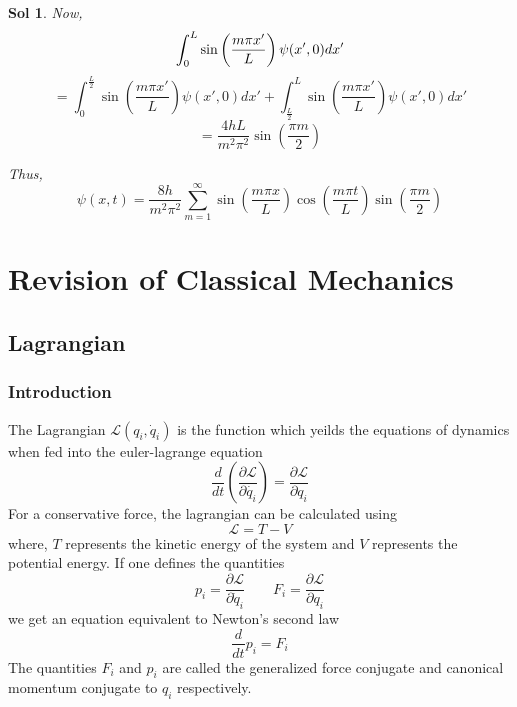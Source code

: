 \documentclass[12pt,a4paper]{report}
\newcommand{\der}[2]{\frac{d#1}{d#2}}
\newcommand{\parder}[2]{\frac{\partial#1}{\partial#2}}
\newcommand{\lagrangian}{\mathcal{L}}
\newcommand{\eulerlagrange}[1]{\der{}{t}\left( \parder{\lagrangian}{\dot{#1}} \right) = \parder{\lagrangian}{#1}}
\newtheorem*{solution}{Sol}
\begin{document}
\begin{solution}
    Now,
    \begin{equation*}
        \int_{0}^{L} \sin\left( \frac{m\pi x'}{L} \right)\psi(x', 0)dx' \\
    \end{equation*}
    \begin{equation*}
        = \int_{0}^{\frac{L}{2}} \sin\left( \frac{m\pi x'}{L} \right)\psi(x', 0)dx' + \int_{\frac{L}{2}}^{L} \sin\left( \frac{m\pi x'}{L} \right)\psi(x', 0)dx'
    \end{equation*}
    \begin{equation*}
        = \frac{4hL}{m^2\pi^2}\sin\left( \frac{\pi m}{2} \right)
    \end{equation*}

    Thus,
    \begin{equation*}
        \psi(x, t) = \frac{8h}{m^2\pi^2}\sum_{m=1}^{\infty}\sin\left( \frac{m\pi x}{L} \right)\cos\left( \frac{m\pi t}{L} \right)\sin\left( \frac{\pi m}{2} \right)
    \end{equation*}
\end{solution}


\chapter{Revision of Classical Mechanics}

\section{Lagrangian}

\subsection{Introduction}

The Lagrangian $\lagrangian(q_i, \dot{q}_i)$ is the function which yeilds the equations of dynamics when fed into the euler-lagrange equation
\begin{equation*}
    \eulerlagrange{q_i}
\end{equation*}
For a conservative force, the lagrangian can be calculated using
\begin{equation*}
    \lagrangian = T - V
\end{equation*}
where, $T$ represents the kinetic energy of the system and $V$ represents the potential energy.
If one defines the quantities
\begin{equation*}
    p_i = \parder{\lagrangian}{\dot{q}_i} \qquad F_i = \parder{\lagrangian}{q_i}
\end{equation*}
we get an equation equivalent to Newton's second law
\begin{equation*}
    \der{}{t}p_i = F_i
\end{equation*}
The quantities $F_i$ and $p_i$ are called the generalized force conjugate and canonical momentum conjugate to $q_i$ respectively.
\end{document}
